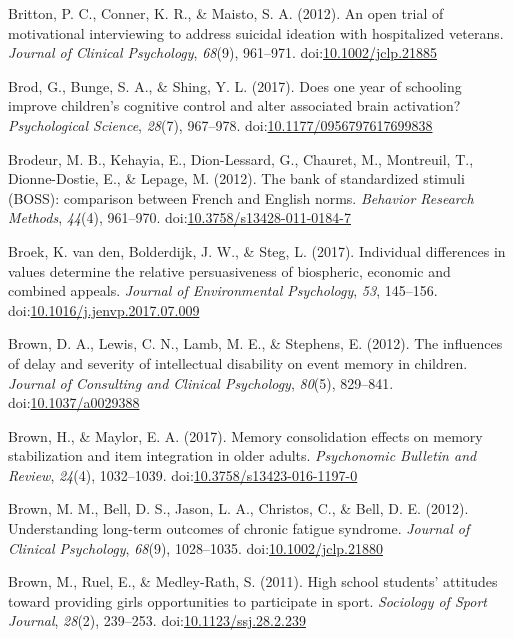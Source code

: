\documentclass[english,man]{apa6}
\theoremstyle{definition}
\theoremstyle{definition}
\theoremstyle{definition}
\theoremstyle{remark}
\begin{document}
\hypertarget{ref-Britton2012}{}
Britton, P. C., Conner, K. R., \& Maisto, S. A. (2012). An open trial of
motivational interviewing to address suicidal ideation with hospitalized
veterans. \emph{Journal of Clinical Psychology}, \emph{68}(9), 961--971.
doi:\href{https://doi.org/10.1002/jclp.21885}{10.1002/jclp.21885}

\hypertarget{ref-Brod2017}{}
Brod, G., Bunge, S. A., \& Shing, Y. L. (2017). Does one year of
schooling improve children's cognitive control and alter associated
brain activation? \emph{Psychological Science}, \emph{28}(7), 967--978.
doi:\href{https://doi.org/10.1177/0956797617699838}{10.1177/0956797617699838}

\hypertarget{ref-Brodeur2012}{}
Brodeur, M. B., Kehayia, E., Dion-Lessard, G., Chauret, M., Montreuil,
T., Dionne-Dostie, E., \& Lepage, M. (2012). The bank of standardized
stimuli (BOSS): comparison between French and English norms.
\emph{Behavior Research Methods}, \emph{44}(4), 961--970.
doi:\href{https://doi.org/10.3758/s13428-011-0184-7}{10.3758/s13428-011-0184-7}

\hypertarget{ref-VandenBroek2017}{}
Broek, K. van den, Bolderdijk, J. W., \& Steg, L. (2017). Individual
differences in values determine the relative persuasiveness of
biospheric, economic and combined appeals. \emph{Journal of
Environmental Psychology}, \emph{53}, 145--156.
doi:\href{https://doi.org/10.1016/j.jenvp.2017.07.009}{10.1016/j.jenvp.2017.07.009}

\hypertarget{ref-Brown2012}{}
Brown, D. A., Lewis, C. N., Lamb, M. E., \& Stephens, E. (2012). The
influences of delay and severity of intellectual disability on event
memory in children. \emph{Journal of Consulting and Clinical
Psychology}, \emph{80}(5), 829--841.
doi:\href{https://doi.org/10.1037/a0029388}{10.1037/a0029388}

\hypertarget{ref-Brown2016}{}
Brown, H., \& Maylor, E. A. (2017). Memory consolidation effects on
memory stabilization and item integration in older adults.
\emph{Psychonomic Bulletin and Review}, \emph{24}(4), 1032--1039.
doi:\href{https://doi.org/10.3758/s13423-016-1197-0}{10.3758/s13423-016-1197-0}

\hypertarget{ref-Brown2012a}{}
Brown, M. M., Bell, D. S., Jason, L. A., Christos, C., \& Bell, D. E.
(2012). Understanding long-term outcomes of chronic fatigue syndrome.
\emph{Journal of Clinical Psychology}, \emph{68}(9), 1028--1035.
doi:\href{https://doi.org/10.1002/jclp.21880}{10.1002/jclp.21880}

\hypertarget{ref-Brown2011}{}
Brown, M., Ruel, E., \& Medley-Rath, S. (2011). High school students'
attitudes toward providing girls opportunities to participate in sport.
\emph{Sociology of Sport Journal}, \emph{28}(2), 239--253.
doi:\href{https://doi.org/10.1123/ssj.28.2.239}{10.1123/ssj.28.2.239}
\end{document}
